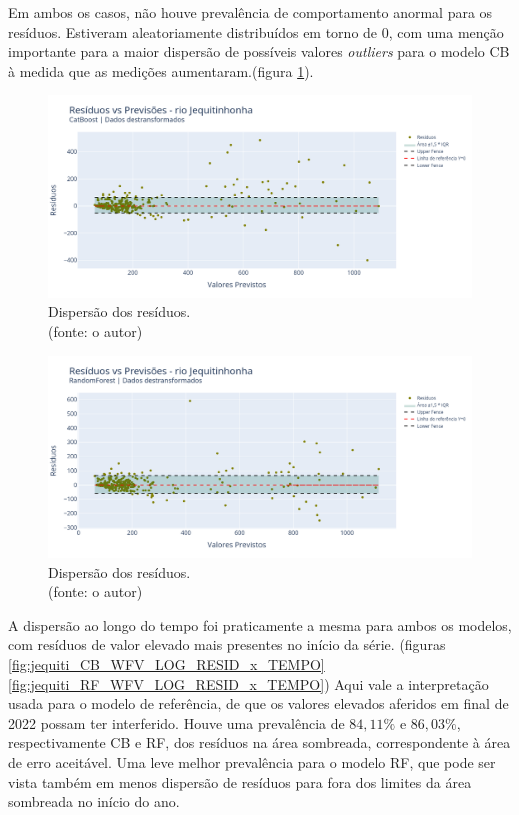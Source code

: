 Em ambos os casos, não houve prevalência de comportamento anormal para os resíduos. Estiveram aleatoriamente distribuídos em torno de $0$, com uma menção importante para a maior dispersão de possíveis valores \textit{outliers} para o modelo CB à medida que as medições aumentaram.(figura \ref{fig:jequiti_CB_WFV_LOG_RESID_x_PREV}).

\begin{figure}[!h]
\centering
\includegraphics[scale=0.33]{Figuras/jequiti/wfv/CB/CB_WFV_LOG_RESID_x_PREV.png}
\caption{Dispersão dos resíduos.\\(fonte: o autor)}
\label{fig:jequiti_CB_WFV_LOG_RESID_x_PREV}
\end{figure}

\begin{figure}[!h]
\centering
\includegraphics[scale=0.33]{Figuras/jequiti/wfv/RF/RF_WFV_LOG_RESID_x_PREV.png}
\caption{Dispersão dos resíduos.\\(fonte: o autor)}
\label{fig:jequiti_RF_WFV_LOG_RESID_x_PREV}
\end{figure}
\clearpage

A dispersão ao longo do tempo foi praticamente a mesma para ambos os modelos, com resíduos de valor elevado mais presentes no início da série. (figuras \ref{fig:jequiti_CB_WFV_LOG_RESID_x_TEMPO} \ref{fig:jequiti_RF_WFV_LOG_RESID_x_TEMPO}) Aqui vale a interpretação usada para o modelo de referência, de que os valores elevados aferidos em final de 2022 possam ter interferido. Houve uma prevalência de $84,11\%$ e $86,03\%$, respectivamente CB e RF, dos resíduos na área sombreada, correspondente à área de erro aceitável. Uma leve melhor prevalência para o modelo RF, que pode ser vista também em menos dispersão de resíduos para fora dos limites da área sombreada no início do ano.

